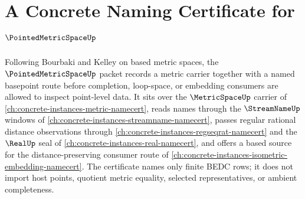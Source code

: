 \chapter{A Concrete Naming Certificate for $\PointedMetricSpaceUp$}
\label{ch:concrete-instances-pointed-metric-space-namecert}

Following Bourbaki and Kelley on based metric spaces, the
$\PointedMetricSpaceUp$ packet records a metric carrier together with a named
basepoint route before completion, loop-space, or embedding consumers are
allowed to inspect point-level data. It sits over the $\MetricSpaceUp$ carrier
of \autoref{ch:concrete-instances-metric-namecert}, reads names through the
$\StreamNameUp$ windows of
\autoref{ch:concrete-instances-streamname-namecert}, passes regular rational
distance observations through \autoref{ch:concrete-instances-regseqrat-namecert}
and the $\RealUp$ seal of \autoref{ch:concrete-instances-real-namecert}, and
offers a based source for the distance-preserving consumer route of
\autoref{ch:concrete-instances-isometric-embedding-namecert}. The certificate
names only finite BEDC rows; it does not import host points, quotient metric
equality, selected representatives, or ambient completeness.

